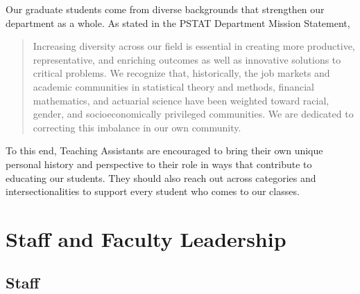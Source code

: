 \documentclass[
  letterpaper,
  DIV=11,
  numbers=noendperiod]{scrreprt}
\begin{document}
Our graduate students come from diverse backgrounds that strengthen our
department as a whole. As stated in the PSTAT Department Mission
Statement,

\begin{quote}
Increasing diversity across our field is essential in creating more
productive, representative, and enriching outcomes as well as innovative
solutions to critical problems. We recognize that, historically, the job
markets and academic communities in statistical theory and methods,
financial mathematics, and actuarial science have been weighted toward
racial, gender, and socioeconomically privileged communities. We are
dedicated to correcting this imbalance in our own community.
\end{quote}

To this end, Teaching Assistants are encouraged to bring their own
unique personal history and perspective to their role in ways that
contribute to educating our students. They should also reach out across
categories and intersectionalities to support every student who comes to
our classes.

\hypertarget{sec-StaffandFacultyContact}{%
\chapter{Staff and Faculty
Leadership}\label{sec-StaffandFacultyContact}}

\hypertarget{Staff}{%
\section*{Staff}\label{Staff}}

\end{document}

